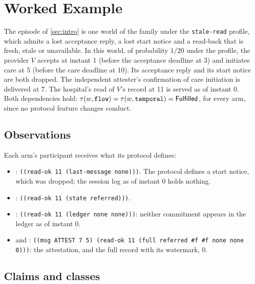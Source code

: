 \section{Worked Example}
\label{sec:example}

The episode of \cref{sec:intro} is one world of the  family under the \texttt{stale-read} profile, which admits a lost acceptance reply, a lost start notice and a read-back that is fresh, stale or unavailable. In this world, of probability $1/20$ under the profile, the provider $V$ accepts at instant 1 (before the acceptance deadline at 3) and initiates care at 5 (before the care deadline at 10). Its acceptance reply and its start notice are both dropped. The independent attester's confirmation of care initiation is delivered at 7. The hospital's read of $V$'s record at 11 is served as of instant 0. Both dependencies hold: $\tau(w, \texttt{flow}) = \tau(w, \texttt{temporal}) = \mathsf{Fulfilled}$, for every arm, since no  protocol feature changes conduct.

\subsection{Observations}

Each arm's participant receives what its protocol defines:
\begingroup\raggedright
\begin{itemize}
\item {}: \texttt{((read-ok 11 (last-message none)))}. The protocol defines a start notice, which was dropped; the session log as of instant 0 holds nothing.
\item {}: \texttt{((read-ok 11 (state referred)))}.
\item {}: \texttt{((read-ok 11 (ledger none none)))}: neither commitment appears in the ledger as of instant 0.
\item {} and : \texttt{((msg ATTEST 7 5) (read-ok 11 (full referred \#f \#f none none 0)))}: the attestation, and the full record with its watermark, 0.
\end{itemize}
\endgroup

\subsection{Claims and classes}

